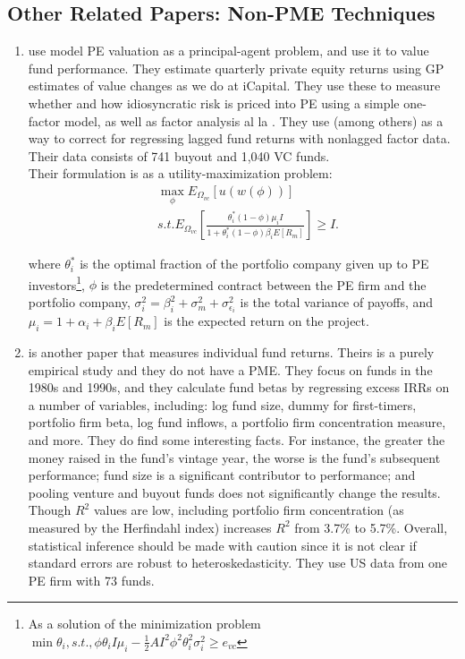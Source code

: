 \documentclass[final,5p,times,twocolumn,authoryear]{elsarticle}
\begin{document}
\subsection{Other Related Papers: Non-PME Techniques}

\begin{enumerate}[resume, label=(\roman*)]
	\item \cite{Ewens2013} use model PE valuation as a principal-agent problem, and use it to value fund performance. They estimate quarterly private equity returns using GP estimates of value changes as we do at iCapital. They use these to measure whether and how idiosyncratic risk is priced into PE using a simple one-factor model, as well as factor analysis al la \cite{Fama1993}. They use \cite{Dimson1979} (among others) as a way to correct for regressing lagged fund returns with nonlagged factor data. Their data consists of 741 buyout and 1,040 VC funds. \\
	
	Their formulation is as a utility-maximization problem:
	\begin{equation} 
	\begin{split}
		&\max_{\phi} E_{\Omega_{vc}} \left[u(w(\phi))\right]  \\
			&s.t. E_{\Omega_{vc}} \left[ \frac{\theta_i^{*} ( 1 - \phi ) \mu_i I}{1 + \theta_i^{*}( 1 - \phi) \beta_i E \left[ R_m \right]}\right] \geq I. 
	\end{split}
	\end{equation}
	
	where $\theta_i^{*}$ is the optimal fraction of the portfolio company given up to PE investors\footnote{As a solution of the minimization problem $\min \theta_i, s.t., \phi\theta_iI\mu_i - \frac{1}{2} AI^2 \phi^2 \theta_i^2 \sigma_i^2 \geq e_{vc}$}, $\phi$ is the predetermined contract between the PE firm and the portfolio company, $\sigma_i^2 = \beta_i^2 + \sigma_m^2 + \sigma_{\epsilon_i}^2$ is the total variance of payoffs, and $\mu_i = 1 + \alpha_i + \beta_i E\left[ R_m \right]$ is the expected return on the project.
	
	\item \cite{Ljungqvist2002} is another paper that measures individual fund returns. Theirs is a purely empirical study and they do not have a PME. They focus on funds in the 1980s and 1990s, and they calculate fund betas by regressing excess IRRs on a number of variables, including: log fund size, dummy for first-timers, portfolio firm beta, log fund inflows, a portfolio firm concentration measure, and more. They do find some interesting facts. For instance, the greater the money raised in the fund's vintage year, the worse is the fund's subsequent performance; fund size is a significant contributor to performance; and pooling venture and buyout funds does not significantly change the results. Though $R^2$ values are low, including portfolio firm concentration (as measured by the Herfindahl index) increases $R^2$ from 3.7\% to 5.7\%. Overall, statistical inference should be made with caution since it is not clear if standard errors are robust to  heteroskedasticity. They use US data from one PE firm with 73 funds.


\end{enumerate}
\end{document}
